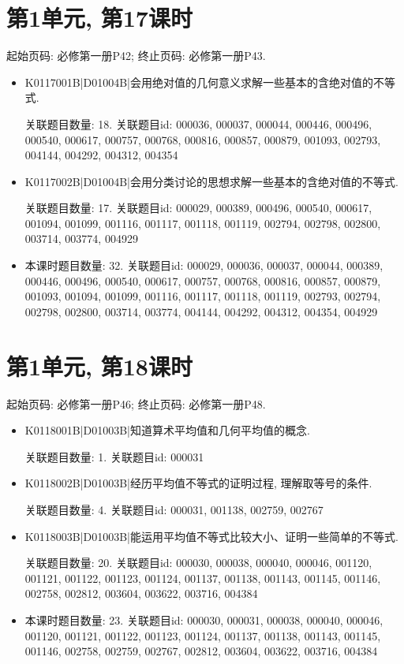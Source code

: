 \section*{第1单元, 第17课时}
起始页码: 必修第一册P42; 终止页码: 必修第一册P43.
\begin{itemize}
\item K0117001B|D01004B|会用绝对值的几何意义求解一些基本的含绝对值的不等式.

关联题目数量: 18. 关联题目id: 000036, 000037, 000044, 000446, 000496, 000540, 000617, 000757, 000768, 000816, 000857, 000879, 001093, 002793, 004144, 004292, 004312, 004354

\item K0117002B|D01004B|会用分类讨论的思想求解一些基本的含绝对值的不等式.

关联题目数量: 17. 关联题目id: 000029, 000389, 000496, 000540, 000617, 001094, 001099, 001116, 001117, 001118, 001119, 002794, 002798, 002800, 003714, 003774, 004929

\item 本课时题目数量: 32. 关联题目id: 000029, 000036, 000037, 000044, 000389, 000446, 000496, 000540, 000617, 000757, 000768, 000816, 000857, 000879, 001093, 001094, 001099, 001116, 001117, 001118, 001119, 002793, 002794, 002798, 002800, 003714, 003774, 004144, 004292, 004312, 004354, 004929

\end{itemize}

\section*{第1单元, 第18课时}
起始页码: 必修第一册P46; 终止页码: 必修第一册P48.
\begin{itemize}
\item K0118001B|D01003B|知道算术平均值和几何平均值的概念.

关联题目数量: 1. 关联题目id: 000031

\item K0118002B|D01003B|经历平均值不等式的证明过程, 理解取等号的条件.

关联题目数量: 4. 关联题目id: 000031, 001138, 002759, 002767

\item K0118003B|D01003B|能运用平均值不等式比较大小、证明一些简单的不等式.

关联题目数量: 20. 关联题目id: 000030, 000038, 000040, 000046, 001120, 001121, 001122, 001123, 001124, 001137, 001138, 001143, 001145, 001146, 002758, 002812, 003604, 003622, 003716, 004384

\item 本课时题目数量: 23. 关联题目id: 000030, 000031, 000038, 000040, 000046, 001120, 001121, 001122, 001123, 001124, 001137, 001138, 001143, 001145, 001146, 002758, 002759, 002767, 002812, 003604, 003622, 003716, 004384

\end{itemize}

